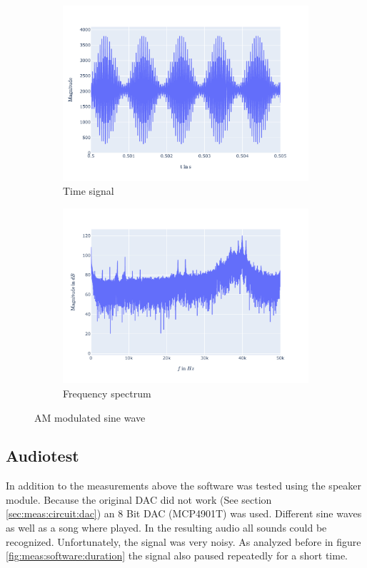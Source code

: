 \begin{figure}
  \centering
  \begin{subfigure}[b]{0.8\textwidth}
    \includegraphics[width=\textwidth]{src/assets/pictures/measurements/software_am_time.pdf}
    \caption{Time signal}
    \label{fig:meas:software:am_time}
  \end{subfigure}
  \hfill
  \begin{subfigure}[b]{0.8\textwidth}
    \includegraphics[width=\textwidth]{src/assets/pictures/measurements/software_am_frequency.pdf}
    \caption{Frequency spectrum}
    \label{fig:meas:software:am_freq}
  \end{subfigure}
  \caption{AM modulated sine wave}
  \label{fig:meas:software:am}
\end{figure}
%
\subsection{Audiotest}

In addition to the measurements above the software was tested using the speaker module. Because the original DAC did not work (See section \ref{sec:meas:circuit:dac}) an 8 Bit DAC (MCP4901T) was used. Different sine waves as well as a song where played. In the resulting audio all sounds could be recognized. Unfortunately, the signal was very noisy. As analyzed before in figure \ref{fig:meas:software:duration} the signal also paused repeatedly for a short time.